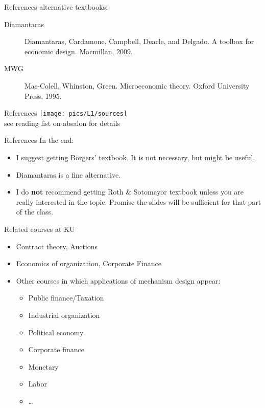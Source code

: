 \documentclass[english,10pt
,aspectratio=169
]{beamer}
\begin{document}
\begin{frame}{References}
	alternative textbooks:
	\begin{description}
		\item[Diamantaras] Diamantaras, Cardamone, Campbell, Deacle, and Delgado. A toolbox for economic design. Macmillan, 2009.
		\item[MWG] Mas-Colell,  Whinston, Green. Microeconomic theory. Oxford University Press, 1995. 
	\end{description}
\end{frame}


\begin{frame}{References}
	\texttt{[image: pics/L1/sources]}
	\\
	see reading list on absalon for details
\end{frame}


\begin{frame}{References}
	In the end:
	\begin{itemize}
		\item I suggest getting B{\"o}rgers' textbook. It is not necessary, but might be useful.
		\item Diamantaras is a fine alternative.
		\item I do \textbf{not} recommend getting Roth \& Sotomayor textbook unless you are really interested in the topic. Promise the slides will be sufficient for that part of the class.
	\end{itemize}
\end{frame}


\begin{frame}{Related courses at KU}
\begin{itemize}
	\item Contract theory, Auctions
	\item Economics of organization, Corporate Finance
	\item Other courses in which applications of mechanism design appear:
	\begin{itemize}
		\item Public finance/Taxation
		\item Industrial organization
		\item Political economy
		\item Corporate finance
		\item Monetary
		\item Labor
		\item \ldots{}
	\end{itemize}
\end{itemize}
\end{frame}
\end{document}
